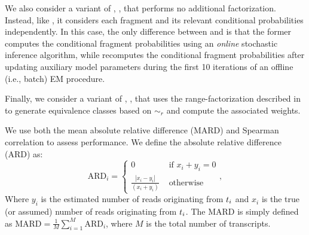 We also consider a variant of \salmon, \salmonfm, that performs no additional
factorization. Instead, like \rsem, it considers each fragment and its relevant
conditional probabilities independently. In this case, the only difference
between \salmonfm and \rsem is that the former computes the conditional fragment
probabilities using an \emph{online} stochastic inference algorithm, while \rsem 
recomputes the conditional fragment probabilities after updating auxiliary model 
parameters during the first 10 iterations of an offline (i.e., batch) EM procedure.

Finally, we consider a variant of \salmon, \salmonrf, that uses the
range-factorization described in~ to generate
equivalence classes based on $\sim_{r}$ and compute the associated weights.

We use both the mean absolute relative difference (MARD) and Spearman correlation
to assess performance.  We define the absolute relative difference (ARD) as:
%
\begin{equation}
\label{eq:ard}
  \text{ARD}_i =
  \begin{cases}
    0                                            & \text{ if } x_i + y_i  = 0 \\
    \frac{\left|x_i - y_i\right|}{ \left(x_i + y_i\right)} & \text{ otherwise }
  \end{cases},
\end{equation}
%
Where $y_i$ is the estimated number of reads originating from $t_{i}$ and $x_i$ is 
the true (or assumed) number of reads originating from $t_{i}$. The MARD is simply 
defined as $\text{MARD} = \frac{1}{M} \sum_{i=1}^{M} \text{ARD}_i$, where $M$ is the 
total number of transcripts.

